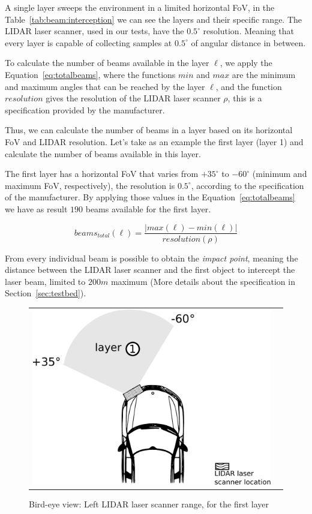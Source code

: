 A single layer sweeps the environment in a limited horizontal FoV, in the Table~\ref{tab:beam:interception} we can see the layers and their specific range. The LIDAR laser scanner, used in our tests, have the $0.5^{\circ}$ resolution. Meaning that every layer is capable of collecting samples at $0.5^{\circ}$ of angular distance in between. 

To calculate the number of beams available in the layer $\ell$, we apply the Equation~\ref{eq:totalbeams}, where the functions $min$ and $max$ are the minimum and maximum angles that can be reached by the layer $\ell$, and the function $resolution$ gives the resolution of the LIDAR laser scanner $\rho$, this is a specification provided by the manufacturer. 

Thus, we can calculate the number of beams in a layer based on its horizontal FoV and LIDAR resolution. Let's take as an example the first layer (layer 1) and calculate the number of beams available in this layer. 

The first layer has a horizontal FoV that varies from $+35^\circ$ to $-60^\circ$ (minimum and maximum FoV, respectively), the resolution is $0.5^\circ$, according to the specification of the manufacturer. By applying those values in  the Equation~\ref{eq:totalbeams} we have as result $190$ beams available for the first layer.

\begin{equation}
\label{eq:totalbeams}
beams_{total}(\ell)=\frac{|max(\ell)-min(\ell)|}{resolution(\rho)}
\end{equation}

From every individual beam is possible to obtain the \textit{impact point}, meaning the distance between the LIDAR laser scanner and the first object to intercept the laser beam, limited to $200m$ maximum (More details about the specification in Section~\ref{sec:testbed}).

\begin{figure}[h]
   \centering
     \begin{tabular}{lr}
       \includegraphics[scale=0.5]{img/fig:demonstrator:superior}
     \end{tabular}
   \caption{Bird-eye view: Left LIDAR laser scanner range, for the first layer}
   \label{fig:demonstrator:superior}
\end{figure}


